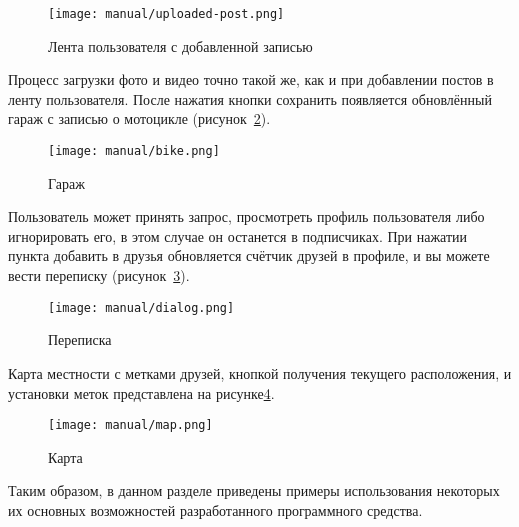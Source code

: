 \begin{figure}[H]
  \centering
    \texttt{[image: manual/uploaded-post.png]}
    \caption{Лента пользователя с добавленной записью}
    \label{fig:manual:uploadedPost}
\end{figure}

Процесс загрузки фото и видео точно такой же, как и при добавлении
постов в ленту пользователя. После нажатия кнопки сохранить появляется
обновлённый гараж с записью о мотоцикле (рисунок~\ref{fig:manual:bike}).

\begin{figure}[H]
  \centering
    \texttt{[image: manual/bike.png]}
    \caption{Гараж}
    \label{fig:manual:bike}
\end{figure}

Пользователь может принять запрос, просмотреть профиль
пользователя либо игнорировать его, в этом случае он останется в
подписчиках. При нажатии пункта добавить в друзья обновляется счётчик
друзей в профиле, и вы можете вести переписку (рисунок~\ref{fig:manual:dialog}).

\begin{figure}[H]
  \centering
    \texttt{[image: manual/dialog.png]}
    \caption{Переписка}
    \label{fig:manual:dialog}
\end{figure}

Карта местности с метками друзей, кнопкой получения текущего
расположения, и установки меток представлена на рисунке\ref{fig:manual:map}.

\begin{figure}[H]
  \centering
    \texttt{[image: manual/map.png]}
    \caption{Карта}
    \label{fig:manual:map}
\end{figure}


Таким образом, в данном разделе приведены примеры использования некоторых их основных возможностей разработанного программного средства.
